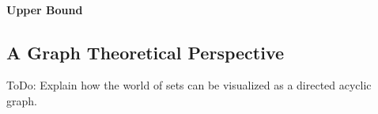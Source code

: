 










\paragraph{Upper Bound}






\subsection{A Graph Theoretical Perspective}
ToDo: Explain how the world of sets can be visualized as a directed acyclic graph. 



